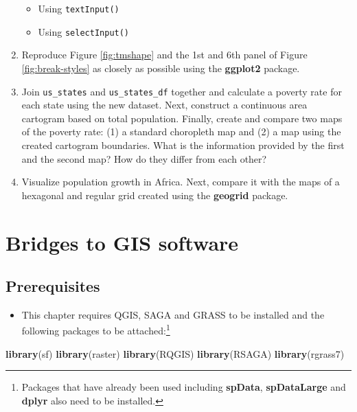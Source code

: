 \documentclass[]{krantz}
\newenvironment{Shaded}{\begin{snugshade}}{\end{snugshade}}
\newcommand{\KeywordTok}[1]{\textcolor[rgb]{0.27,0.27,0.27}{\textbf{#1}}}
\newcommand{\NormalTok}[1]{#1}
\providecommand{\tightlist}{%
  \setlength{\itemsep}{0pt}\setlength{\parskip}{0pt}}
\let\rmarkdownfootnote\footnote%
\def\footnote{\protect\rmarkdownfootnote}
\begin{document}
\begin{enumerate}
  \begin{itemize}
  \tightlist
  \item
    Using \texttt{textInput()}
  \item
    Using \texttt{selectInput()}
  \end{itemize}
\item
  Reproduce Figure \ref{fig:tmshape} and the 1st and 6th panel of Figure \ref{fig:break-styles} as closely as possible using the \textbf{ggplot2} package.
\item
  Join \texttt{us\_states} and \texttt{us\_states\_df} together and calculate a poverty rate for each state using the new dataset.
  Next, construct a continuous area cartogram based on total population.
  Finally, create and compare two maps of the poverty rate: (1) a standard choropleth map and (2) a map using the created cartogram boundaries.
  What is the information provided by the first and the second map?
  How do they differ from each other?
\item
  Visualize population growth in Africa.
  Next, compare it with the maps of a hexagonal and regular grid created using the \textbf{geogrid} package.
\end{enumerate}

\hypertarget{gis}{%
\section{Bridges to GIS software}\label{gis}}

\hypertarget{prerequisites-7}{%
\subsection*{Prerequisites}\label{prerequisites-7}}

\begin{itemize}
\tightlist
\item
  This chapter requires QGIS, SAGA and GRASS to be installed and the following packages to be attached:\footnote{Packages that have already been used including \textbf{spData}, \textbf{spDataLarge} and \textbf{dplyr} also need to be installed. }
\end{itemize}

\begin{Shaded}
\begin{Highlighting}[]
\KeywordTok{library}\NormalTok{(sf)}
\KeywordTok{library}\NormalTok{(raster)}
\KeywordTok{library}\NormalTok{(RQGIS)}
\KeywordTok{library}\NormalTok{(RSAGA)}
\KeywordTok{library}\NormalTok{(rgrass7)}
\end{Highlighting}
\end{Shaded}
\end{document}
